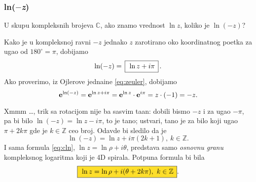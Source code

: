 \subsubsection{ln($-$\textit{z})}

\zadatak U skupu kompleksnih brojeva $\mathbb C$, ako znamo vrednost $\ln z$,
koliko je $\ln(-z)$?

\resenje Kako je u kompleksnoj ravni $-z$ jednako $z$ zarotirano 
oko koordi\-natnog po{\cv}etka
za ugao od $180^\circ=\pi$, dobijamo
$$
\ln (-z) = \ram{\ln z +i\pi}.
$$ 
Ako proverimo, iz Ojlerove jedna{\cv}ine \eqref{eq:zeuler}, dobijamo
$$
{\bf e}^{\ln(-z)} = {\bf e}^{\ln z+i\pi} = {\bf e}^{\ln z}\cdot {\bf e}^{i\pi}=z \cdot (-1)=-z.
$$

\dodatak Xmmm \dots, trik sa rotacijom nije ba{\sv} sasvim ta{\cv}an: dobili bismo $-z$ i za ugao $-\pi$,
pa bi bilo $\ln(-z)=\ln z-i\pi$, {\sv}to je ta{\cv}no;
ustvari, ta{\cv}no je za bilo koji ugao $\pi+2k\pi$ gde je $k\in{\mathbb Z}$ ceo broj. Odavde bi sledilo da je
$$
\ln(-z) = \ln z + i\pi(2k+1),\ k\in{\mathbb Z}.
$$
I sama formula \eqref{eq:cln}, $\ln z=\ln\rho + i\theta$, predstav{\lj}a samo {\sl osnovnu granu\/}
kompleksnog logaritma koji je 4D spirala. Potpuna formula bi bila
\begin{equation}
    \okvir{\ln z=\ln\rho + i(\theta + 2k\pi),\ k\in{\mathbb Z}} .
\end{equation}